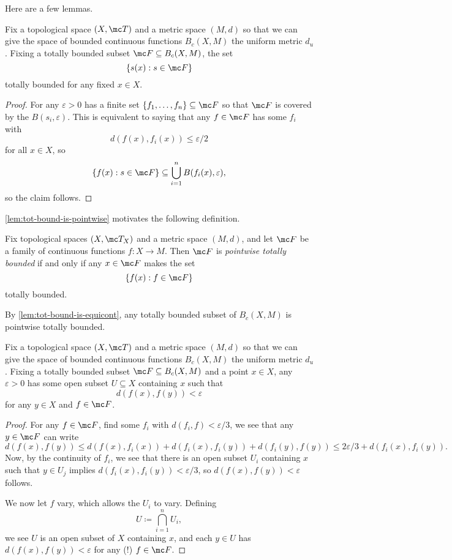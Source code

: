\documentclass[../notes.tex]{subfiles}
\begin{document}
Here are a few lemmas.
\begin{lemma} \label{lem:tot-bound-is-pointwise}
	Fix a topological space $(X,\mc T)$ and a metric space $(M,d)$ so that we can give the space of bounded continuous functions $B_c(X,M)$ the uniform metric $d_u$. Fixing a totally bounded subset $\mc F\subseteq B_c(X,M)$, the set
	\[\{s(x):s\in \mc F\}\]
	totally bounded for any fixed $x\in X$.
\end{lemma}
\begin{proof}
	For any $\varepsilon>0$ has a finite set $\{f_1,\ldots,f_n\}\subseteq \mc F$ so that $\mc F$ is covered by the $B(s_i,\varepsilon)$. This is equivalent to saying that any $f\in \mc F$ has some $f_i$ with
	\[d(f(x),f_i(x))\le\varepsilon/2\]
	for all $x\in X$, so
	\[\{f(x):s\in \mc F\}\subseteq\bigcup_{i=1}^nB(f_i(x),\varepsilon),\]
	so the claim follows.
\end{proof}
\autoref{lem:tot-bound-is-pointwise} motivates the following definition.
\begin{definition}
	Fix topological spaces $(X,\mc T_X)$ and a metric space $(M,d)$, and let $\mc F$ be a family of continuous functions $f\colon X\to M$. Then $\mc F$ is \textit{pointwise totally bounded} if and only if any $x\in \mc F$ makes the set
	\[\{f(x):f\in\mc F\}\]
	totally bounded.
\end{definition}
\begin{example}
	By \autoref{lem:tot-bound-is-equicont}, any totally bounded subset of $B_c(X,M)$ is pointwise totally bounded.
\end{example}
\begin{lemma} \label{lem:tot-bound-is-equicont}
	Fix a topological space $(X,\mc T)$ and a metric space $(M,d)$ so that we can give the space of bounded continuous functions $B_c(X,M)$ the uniform metric $d_u$. Fixing a totally bounded subset $\mc F\subseteq B_c(X,M)$ and a point $x\in X$, any $\varepsilon>0$ has some open subset $U\subseteq X$ containing $x$ such that
	\[d(f(x),f(y))<\varepsilon\]
	for any $y\in X$ and $f\in \mc F$.
\end{lemma}
\begin{proof}
	For any $f\in \mc F$, find some $f_i$ with $d(f_i,f)<\varepsilon/3$, we see that any $y\in \mc F$ can write
	\[d(f(x),f(y))\le d(f(x),f_i(x))+d(f_i(x),f_i(y))+d(f_i(y),f(y))\le2\varepsilon/3+d(f_i(x),f_i(y)).\]
	Now, by the continuity of $f_i$, we see that there is an open subset $U_i$ containing $x$ such that $y\in U_j$ implies $d(f_i(x),f_i(y))<\varepsilon/3$, so $d(f(x),f(y))<\varepsilon$ follows.

	We now let $f$ vary, which allows the $U_i$ to vary. Defining
	\[U\coloneqq\bigcap_{i=1}^nU_i,\]
	we see $U$ is an open subset of $X$ containing $x$, and each $y\in U$ has $d(f(x),f(y))<\varepsilon$ for any (!) $f\in \mc F$.
\end{proof}
\end{document}
